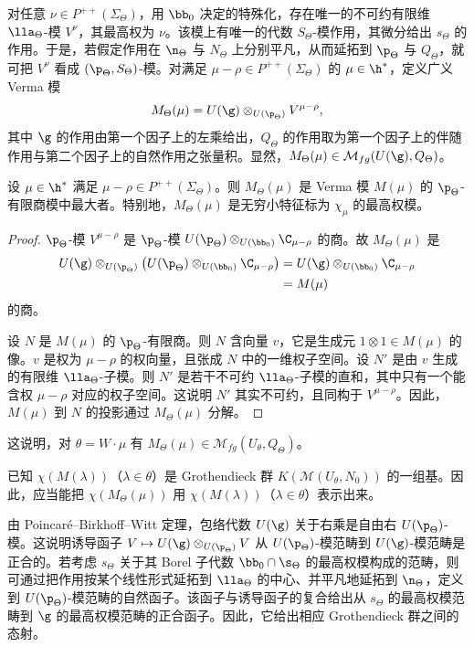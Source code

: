 对任意 $\nu\in P^{++}(\Sigma_\Theta)$，用 $\bb_0$ 决定的特殊化，存在唯一的不可约有限维 $\lla_\Theta$-模 $V^\nu$，其最高权为 $\nu$。该模上有唯一的代数 $S_\Theta$-模作用，其微分给出 $s_\Theta$ 的作用。于是，若假定作用在 $\n_\Theta$ 与 $N_\Theta$ 上分别平凡，从而延拓到 $\p_\Theta$ 与 $Q_\Theta$，就可把 $V^\nu$ 看成 $(\p_\Theta,S_\Theta)$-模。对满足 $\mu-\rho\in P^{++}(\Sigma_\Theta)$ 的 $\mu\in\h^*$，定义广义 Verma 模
$$M_\Theta(\mu)=U(\g)\otimes_{U(\p_\Theta)}V^{\mu-\rho},$$
其中 $\g$ 的作用由第一个因子上的左乘给出，$Q_\Theta$ 的作用取为第一个因子上的伴随作用与第二个因子上的自然作用之张量积。显然，$M_\Theta(\mu)\in\mathcal{M}_{fg}(U(\g),Q_\Theta)$。

\begin{lemma}\label{lem:06.2.7}
设 $\mu\in\h^*$ 满足 $\mu-\rho\in P^{++}(\Sigma_\Theta)$。则 $M_\Theta(\mu)$ 是 Verma 模 $M(\mu)$ 的 $\p_\Theta$-有限商模中最大者。特别地，$M_\Theta(\mu)$ 是无穷小特征标为 $\chi_\mu$ 的最高权模。
\end{lemma}

\begin{proof}
$\p_\Theta$-模 $V^{\mu-\rho}$ 是 $\p_\Theta$-模 $U(\p_\Theta)\otimes_{U(\bb_0)}\C_{\mu-\rho}$ 的商。故 $M_\Theta(\mu)$ 是
\begin{align*}
U(\g)\otimes_{U(\p_\Theta)}\bigl(U(\p_\Theta)\otimes_{U(\bb_0)}\C_{\mu-\rho}\bigr)&=U(\g)\otimes_{U(\bb_0)}\C_{\mu-\rho}\\
&=M(\mu)
\end{align*}
的商。

设 $N$ 是 $M(\mu)$ 的 $\p_\Theta$-有限商。则 $N$ 含向量 $v$，它是生成元 $1\otimes1\in M(\mu)$ 的像。$v$ 是权为 $\mu-\rho$ 的权向量，且张成 $N$ 中的一维权子空间。设 $N'$ 是由 $v$ 生成的有限维 $\lla_\Theta$-子模。则 $N'$ 是若干不可约 $\lla_\Theta$-子模的直和，其中只有一个能含权 $\mu-\rho$ 对应的权子空间。这说明 $N'$ 其实不可约，且同构于 $V^{\mu-\rho}$。因此，$M(\mu)$ 到 $N$ 的投影通过 $M_\Theta(\mu)$ 分解。
\end{proof}

这说明，对 $\theta=W\cdot\mu$ 有 $M_\Theta(\mu)\in\mathcal{M}_{fg}(U_\theta,Q_\Theta)$。

已知 $\chi(M(\lambda))$（$\lambda\in\theta$）是 Grothendieck 群 $K(\mathcal{M}(U_\theta,N_0))$ 的一组基。因此，应当能把 $\chi(M_\Theta(\mu))$ 用 $\chi(M(\lambda))$（$\lambda\in\theta$）表示出来。

由 Poincaré--Birkhoff--Witt 定理，包络代数 $U(\g)$ 关于右乘是自由右 $U(\p_\Theta)$-模。这说明诱导函子 $V\mapsto U(\g)\otimes_{U(\p_\Theta)}V$ 从 $U(\p_\Theta)$-模范畴到 $U(\g)$-模范畴是正合的。若考虑 $s_\Theta$ 关于其 Borel 子代数 $\bb_0\cap\s_\Theta$ 的最高权模构成的范畴，则可通过把作用按某个线性形式延拓到 $\lla_\Theta$ 的中心、并平凡地延拓到 $\n_\Theta$，定义到 $U(\p_\Theta)$-模范畴的自然函子。该函子与诱导函子的复合给出从 $s_\Theta$ 的最高权模范畴到 $\g$ 的最高权模范畴的正合函子。因此，它给出相应 Grothendieck 群之间的态射。

